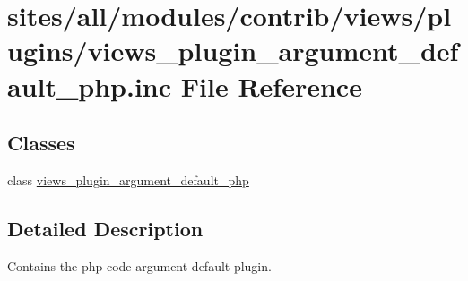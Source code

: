 \hypertarget{views__plugin__argument__default__php_8inc}{
\section{sites/all/modules/contrib/views/plugins/views\_\-plugin\_\-argument\_\-default\_\-php.inc File Reference}
\label{views__plugin__argument__default__php_8inc}
}
\subsection*{Classes}
\begin{CompactItemize}
\item 
class \hyperlink{classviews__plugin__argument__default__php}{views\_\-plugin\_\-argument\_\-default\_\-php}
\end{CompactItemize}


\subsection{Detailed Description}
Contains the php code argument default plugin. 